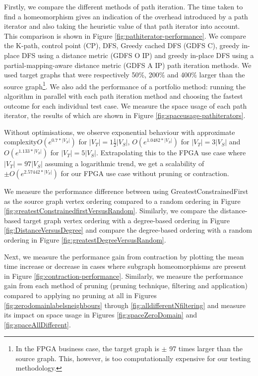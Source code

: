Firstly, we compare the different methods of path iteration. The time taken to find a homeomorphism gives an indication of the overhead introduced by a path iterator and also taking the heuristic value of that path iterator into account. This comparison is shown in Figure \ref{fig:pathiterator-performance}. We compare the K-path, control point (CP), DFS, Greedy cached DFS (GDFS C), greedy in-place DFS using a distance metric (GDFS O IP) and greedy in-place DFS using a partial-mapping-aware distance metric (GDFS A IP) path iteration methods. We used target graphs that were respectively 50\%, 200\% and 400\% larger than the source graph\footnote{In the FPGA business case, the target graph is $\pm$ 97 times larger than the source graph. This, however, is too computationally expensive for our testing methodology.}. We also add the performance of a portfolio method: running the algorithm in parallel with each path iteration method and choosing the fastest outcome for each individual test case. We measure the space usage of each path iterator, the results of which are shown in Figure \ref{fig:spaceusage-pathiterators}.

Without optimisations, we observe exponential behaviour with approximate complexity$O(e^{0.7*|V_S|})$ for $|V_T|=1\frac{1}{2}|V_S|$, $O(e^{1.0482*|V_S|})$ for $|V_T|=3|V_S|$ and $O(e^{1.133*|V_S|})$ for $|V_T|=5|V_S|$. Extrapolating this to the FPGA use case where $|V_T|=97|V_S|$ assuming a logarithmic trend, we get a scalability of $\pm O(e^{2.57442*|V_S|})$ for our FPGA use case without pruning or contraction.

We measure the performance difference between using GreatestConstrainedFirst as the source graph vertex ordering compared to a random ordering in Figure \ref{fig:greatestConstrainedfirstVersusRandom}. Similarly, we compare the distance-based target graph vertex ordering with a degree-based ordering in Figure \ref{fig:DistanceVersusDegree} and compare the degree-based ordering with a random ordering in Figure \ref{fig:greatestDegreeVersusRandom}.

Next, we measure the performance gain from contraction by plotting the mean time increase or decrease in cases where subgraph homeomorphisms are present in Figure \ref{fig:contraction-performance}. Similarly, we measure the performance gain from each method of pruning (pruning technique, filtering and application) compared to applying no pruning at all in Figures \ref{fig:zerodomainlabelsneighbours} through \ref{fig:alldifferentNfiltering} and measure its impact on space usage in Figures \ref{fig:spaceZeroDomain} and \ref{fig:spaceAllDifferent}.

